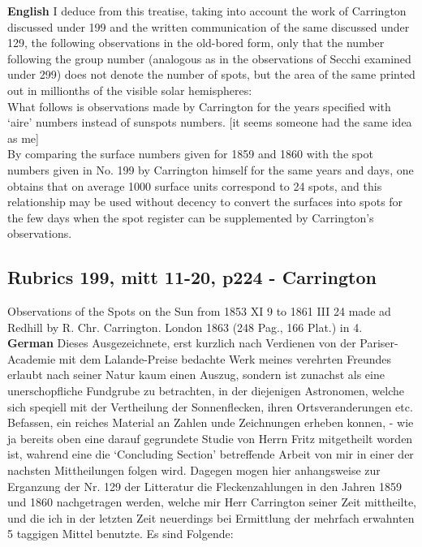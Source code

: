 \documentclass[12pt]{article}
\begin{document}
\textbf{English}
I deduce from this treatise, taking into account the work of Carrington discussed under 199 and the written communication of the same discussed under 129, the following observations in the old-bored form, only that the number following the group number (analogous as in the observations of Secchi examined under 299) does not denote the number of spots, but the area of the same printed out in millionths of the visible solar hemispheres:\\

What follows is observations made by Carrington for the years specified with `aire' numbers instead of sunspots numbers. [it seems someone had the same idea as me]\\

By comparing the surface numbers given for 1859 and 1860 with the spot numbers given in No. 199 by Carrington himself for the same years and days, one obtains that on average 1000 surface units correspond to 24 spots, and this relationship may be used without decency to convert the surfaces into spots for the few days when the spot register can be supplemented by Carrington's observations.

\subsection{Rubrics 199, mitt 11-20, p224 - Carrington}

Observations of the Spots on the Sun from 1853 XI 9 to 1861 III 24 made ad Redhill by R. Chr. Carrington. London 1863 (248 Pag., 166 Plat.) in 4.\\

\textbf{German} 
Dieses Ausgezeichnete, erst kurzlich nach Verdienen von der Pariser-Academie mit dem Lalande-Preise bedachte Werk meines verehrten Freundes erlaubt nach seiner Natur kaum einen Auszug, sondern ist zunachst als eine unerschopfliche Fundgrube zu betrachten, in der diejenigen Astronomen, welche sich speqiell mit der Vertheilung der Sonnenflecken, ihren Ortsveranderungen etc. Befassen, ein reiches Material an Zahlen unde Zeichnungen erheben konnen, - wie ja bereits oben eine darauf gegrundete Studie von Herrn Fritz mitgetheilt worden ist, wahrend eine die `Concluding Section' betreffende Arbeit von mir in einer der nachsten Mittheilungen folgen wird. Dagegen mogen hier anhangsweise zur Erganzung der Nr. 129 der Litteratur die Fleckenzahlungen in den Jahren 1859 und 1860 nachgetragen werden, welche mir Herr Carrington seiner Zeit mittheilte, und die ich in der letzten Zeit neuerdings bei Ermittlung der mehrfach erwahnten 5 taggigen Mittel benutzte. Es sind Folgende:\\
\end{document}
